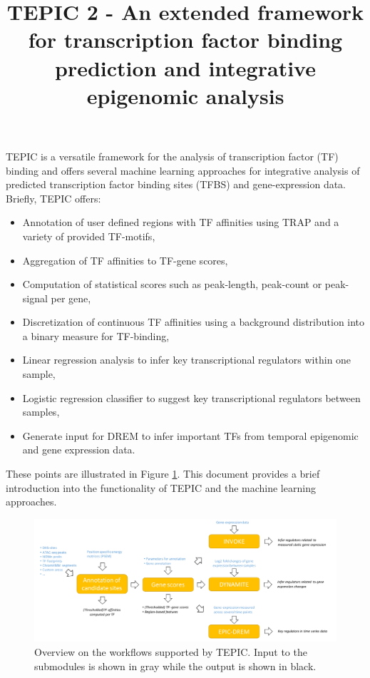 \documentclass{article}
\date{}
\begin{document}
\title{TEPIC 2 - An extended framework for transcription factor binding prediction and integrative epigenomic analysis}
\maketitle

TEPIC is a versatile framework for the analysis of transcription factor (TF) binding and offers several machine learning approaches for integrative analysis of predicted transcription factor binding sites (TFBS) and gene-expression data.
Briefly, TEPIC offers:
\begin{itemize}
\item Annotation of user defined regions with TF affinities using TRAP and a variety of provided TF-motifs,
\item Aggregation of TF affinities to TF-gene scores,
\item Computation of statistical scores such as peak-length, peak-count or peak-signal per gene,
\item Discretization of continuous TF affinities using a background distribution into a binary measure for TF-binding,
\item Linear regression analysis to infer key transcriptional regulators within one sample,
\item Logistic regression classifier to suggest key transcriptional regulators between samples,
\item Generate input for DREM to infer important TFs from temporal epigenomic and gene expression data.
\end{itemize}

These points are illustrated in Figure \ref{FigOverview}.
This document provides a brief introduction into the functionality of TEPIC and the machine learning approaches. 
\begin{figure}[h]
\includegraphics[width=\textwidth]{workflow_TEPIC_General.pdf}
\caption{Overview on the workflows supported by TEPIC. Input to the submodules is shown in gray while the output is shown in black.}
\label{FigOverview}
\end{figure}
\newpage
\end{document}
